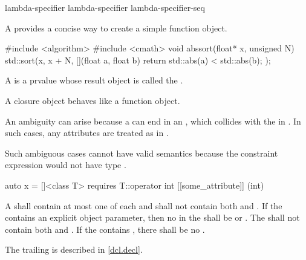 \begin{bnf}
\br
    \br
    \br
    \br
\end{bnf}

\begin{bnf}
\br
    lambda-specifier\br
    lambda-specifier lambda-specifier-seq
\end{bnf}

\pnum
A  provides
a concise way to create a simple function object.
\begin{example}
\begin{codeblock}
#include <algorithm>
#include <cmath>
void abssort(float* x, unsigned N) {
  std::sort(x, x + N, [](float a, float b) { return std::abs(a) < std::abs(b); });
}
\end{codeblock}
\end{example}

\pnum
A  is a prvalue
whose result object is called the .
\begin{note}
A closure object behaves like a function
object.
\end{note}

\pnum
An ambiguity can arise
because a  can end in
an ,
which collides with
the  in .
In such cases,
any attributes are treated as
 in .
\begin{note}
Such ambiguous cases cannot have valid semantics
because the constraint expression would not have type .
\begin{example}
\begin{codeblock}
auto x = []<class T> requires T::operator int [[some_attribute]] (int) { }
\end{codeblock}
\end{example}
\end{note}

\pnum
A 
shall contain at most one of each  and
shall not contain both  and .
If the  contains
an explicit object parameter,
then no  in the 
shall be  or .
The  shall not contain
both  and .
If the  contains ,
there shall be no .
\begin{note}
The trailing  is described in \ref{dcl.decl}.
\end{note}

